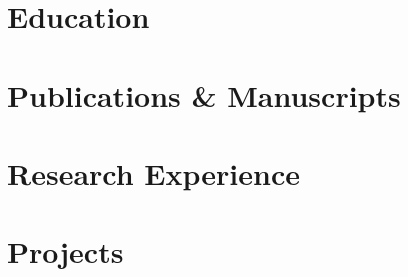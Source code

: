 \documentclass[letterpaper,11pt]{article}
\begin{document}


\section{Education}
    \resumeSubHeadingListStart
        
        
    \resumeSubHeadingListEnd

\section{Publications \& Manuscripts}
    \resumeSubHeadingListStart
        
        
        
    \resumeSubHeadingListEnd

\section{Research Experience}
    \resumeSubHeadingListStart
        
        




    \resumeSubHeadingListEnd

\section{Projects}
    \resumeSubHeadingListStart
        
                
    \resumeSubHeadingListEnd


%
\end{document}
